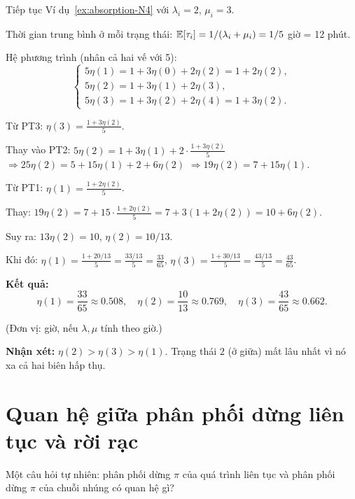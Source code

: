 \begin{example}[Thời gian hấp thụ trung bình với $N = 4$]
Tiếp tục Ví dụ~\ref{ex:absorption-N4} với $\lambda_i = 2$, $\mu_i = 3$.

Thời gian trung bình ở mỗi trạng thái: $\mathbb{E}[\tau_i] = 1/(\lambda_i + \mu_i) = 1/5$ giờ = 12 phút.

Hệ phương trình (nhân cả hai vế với 5):
\[
  \begin{cases}
    5\eta(1) = 1 + 3\eta(0) + 2\eta(2) = 1 + 2\eta(2), \\
    5\eta(2) = 1 + 3\eta(1) + 2\eta(3), \\
    5\eta(3) = 1 + 3\eta(2) + 2\eta(4) = 1 + 3\eta(2).
  \end{cases}
\]

Từ PT3: $\eta(3) = \frac{1 + 3\eta(2)}{5}$.

Thay vào PT2: $5\eta(2) = 1 + 3\eta(1) + 2 \cdot \frac{1 + 3\eta(2)}{5}$
$\Rightarrow 25\eta(2) = 5 + 15\eta(1) + 2 + 6\eta(2)$
$\Rightarrow 19\eta(2) = 7 + 15\eta(1)$.

Từ PT1: $\eta(1) = \frac{1 + 2\eta(2)}{5}$.

Thay: $19\eta(2) = 7 + 15 \cdot \frac{1 + 2\eta(2)}{5} = 7 + 3(1 + 2\eta(2)) = 10 + 6\eta(2)$.

Suy ra: $13\eta(2) = 10$, $\eta(2) = 10/13$.

Khi đó: $\eta(1) = \frac{1 + 20/13}{5} = \frac{33/13}{5} = \frac{33}{65}$,
$\eta(3) = \frac{1 + 30/13}{5} = \frac{43/13}{5} = \frac{43}{65}$.

\textbf{Kết quả:}
\[
  \eta(1) = \frac{33}{65} \approx 0.508, \quad
  \eta(2) = \frac{10}{13} \approx 0.769, \quad
  \eta(3) = \frac{43}{65} \approx 0.662.
\]

(Đơn vị: giờ, nếu $\lambda, \mu$ tính theo giờ.)

\textbf{Nhận xét:} $\eta(2) > \eta(3) > \eta(1)$. Trạng thái $2$ (ở giữa) mất lâu nhất
vì nó xa cả hai biên hấp thụ.
\end{example}

\section{Quan hệ giữa phân phối dừng liên tục và rời rạc}
\label{sec:continuous-vs-discrete}

Một câu hỏi tự nhiên: phân phối dừng $\pi$ của quá trình liên tục
và phân phối dừng $\hat{\pi}$ của chuỗi nhúng có quan hệ gì?


